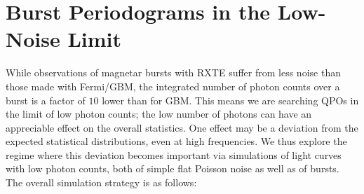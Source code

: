 \documentclass[numberedappendix]{emulateapj}
\begin{document}
\section{Burst Periodograms in the Low-Noise Limit}

While observations of magnetar bursts with RXTE suffer from less noise than those made with Fermi/GBM, the integrated number of photon counts over a burst is a factor of $10$ lower than for GBM. This means we are searching QPOs in the limit of low photon counts; the low number of photons can have an appreciable effect on the overall statistics. One effect may be a deviation from the expected statistical distributions, even at high frequencies. We thus explore the regime where this deviation becomes important via simulations of light curves with low photon counts, both of simple flat Poisson noise as well as of bursts.
The overall simulation strategy is as follows:
\end{document}
